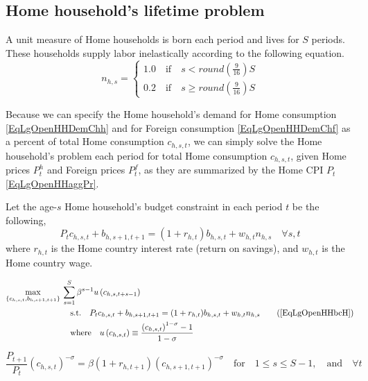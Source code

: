 \documentclass[letterpaper,12pt]{article}
\theoremstyle{definition}
\begin{document}
  \subsection{Home household's lifetime problem}\label{SecLgOpenHHlifeH}

    A unit measure of Home households is born each period and lives for $S$ periods. These households supply labor inelastically according to the following equation.
    \begin{equation}\label{EqLgOpenHHlabH}
      n_{h,s} =
        \begin{cases}
          1.0 \quad\text{if}\quad s < round\left(\frac{9}{16}\right)S \\
          0.2 \quad\text{if}\quad s \geq round\left(\frac{9}{16}\right)S
        \end{cases}
    \end{equation}

    Because we can specify the Home household's demand for Home consumption \eqref{EqLgOpenHHDemChh} and for Foreign consumption \eqref{EqLgOpenHHDemChf} as a percent of total Home consumption $c_{h,s,t}$, we can simply solve the Home household's problem each period for total Home consumption $c_{h,s,t}$, given Home prices $P^h_t$ and Foreign prices $P^f_t$, as they are summarized by the Home CPI $P_t$ \eqref{EqLgOpenHHaggPr}.

    Let the age-$s$ Home household's budget constraint in each period $t$ be the following,
    \begin{equation}\label{EqLgOpenHHbcH}
      P_t c_{h,s,t} + b_{h,s+1,t+1} = (1 + r_{h,t})b_{h,s,t} + w_{h,t}n_{h,s} \quad\forall s, t
    \end{equation}
    where $r_{h,t}$ is the Home country interest rate (return on savings), and $w_{h,t}$ is the Home country wage.

    \begin{align}
      \max_{\{c_{h,s,t},b_{h,s+1,t+1}\}}\: &\sum_{s=1}^S \beta^{s-1}u\left(c_{h,s,t+s-1}\right) \label{EqLgOpenHHmaxprobH} \\
      &\quad\text{s.t.}\quad P_t c_{h,s,t} + b_{h,s+1,t+1} = (1 + r_{h,t})b_{h,s,t} + w_{h,t}n_{h,s} \tag{\ref{EqLgOpenHHbcH}} \\
      &\quad\text{where}\quad u\left(c_{h,s,t}\right) \equiv \frac{\left(c_{h,s,t}\right)^{1-\sigma} - 1}{1 - \sigma}
    \end{align}

    \begin{equation}\label{EqLgOpenHHeul_bH}
      \frac{P_{t+1}}{P_t}\left(c_{h,s,t}\right)^{-\sigma} = \beta(1 + r_{h,t+1})\left(c_{h,s+1,t+1}\right)^{-\sigma} \quad\text{for}\quad 1\leq s\leq S-1,\quad\text{and}\quad\forall t
    \end{equation}
\end{document}
